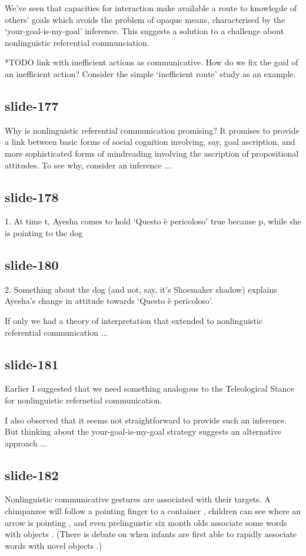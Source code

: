 \documentclass[12pt,\papersize]{extarticle}
\begin{document}
We’ve seen that capacities for interaction make available a route
to knowlegde of others’ goals which avoids the problem of opaque means,
characterised by the ‘your-goal-is-my-goal’ inference.
This suggests a solution to a challenge about nonlinguistic referential communciation.

*TODO link with inefficient actions as communicative.
How do we fix the goal of an inefficient action?
Consider the simple ‘inefficient route’ study as an example.

\subsection{slide-177}
Why is nonlinguistic referential communication promising?
It promises to provide a link between basic forms of social cognition
involving, say, goal ascription, and more sophisticated forms of
mindreading involving the ascription of propositional attitudes.
To see why, consider an inference ...

\subsection{slide-178}
1. At time t, Ayesha comes to hold ‘Questo è pericoloso’ true because p, while she is pointing to the dog

\subsection{slide-180}
2. Something about the dog (and not, say, it’s Shoemaker shadow) explains Ayesha’s change in attitude towards  ‘Questo è pericoloso’.

If only we had a theory of interpretation that extended to nonlinguistic referential communication ...

\subsection{slide-181}
Earlier I suggested that we need something analogous to the
Teleological Stance for nonlinguistic refernetial communication.

I also observed that it seems not straightforward to provide
such an inference.
But thinking about the your-goal-is-my-goal strategy suggests
an alternative approach ...

\subsection{slide-182}
Nonlinguistic communicative gestures are associated with their targets.
A chimpanzee will follow a pointing finger to a container \citep[see][p.\ 6]{Moll:2007gu},
children can see where an arrow is pointing \citep[compare][]{leekam_adults_2010},
and even prelinguistic six month olds associate some words with objects
 \citep{tincoff:1999_beginnings_,tincoff:2011}.
(There is debate on when infants are first able to rapidly associate words with novel objects \citep{werker:1998_acquisition,friedrich:2011_word_}.)
\end{document}
